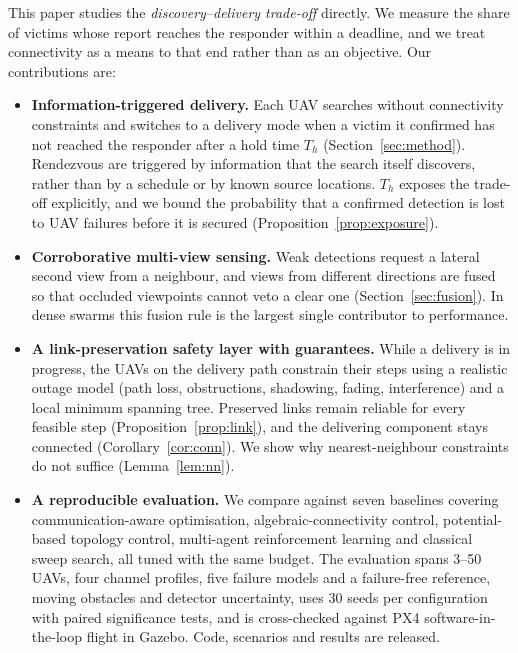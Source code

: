This paper studies the \emph{discovery--delivery trade-off} directly. We measure the share of
victims whose report reaches the responder within a deadline, and we treat connectivity as a means
to that end rather than as an objective. Our contributions are:
\begin{itemize}
\item \textbf{Information-triggered delivery.} Each UAV searches without connectivity constraints and
switches to a delivery mode when a victim it confirmed has not reached the responder after a hold
time $T_h$ (Section~\ref{sec:method}). Rendezvous are triggered by information that the search
itself discovers, rather than by a schedule or by known source locations. $T_h$ exposes the
trade-off explicitly, and we bound the probability that a confirmed detection is lost to UAV
failures before it is secured (Proposition~\ref{prop:exposure}).
\item \textbf{Corroborative multi-view sensing.} Weak detections request a lateral second view from a
neighbour, and views from different directions are fused so that occluded viewpoints cannot veto a
clear one (Section~\ref{sec:fusion}). In dense swarms this fusion rule is the largest single
contributor to performance.
\item \textbf{A link-preservation safety layer with guarantees.} While a delivery is in progress,
the UAVs on the delivery path constrain their steps using a realistic outage model (path loss,
obstructions, shadowing, fading, interference) and a local minimum spanning tree. Preserved links
remain reliable for every feasible step (Proposition~\ref{prop:link}), and the delivering component
stays connected (Corollary~\ref{cor:conn}). We show why nearest-neighbour constraints do not
suffice (Lemma~\ref{lem:nn}).
\item \textbf{A reproducible evaluation.} We compare against seven baselines covering
communication-aware optimisation, algebraic-connectivity control, potential-based topology control,
multi-agent reinforcement learning and classical sweep search, all tuned with the same budget. The
evaluation spans 3--50 UAVs, four channel profiles, five failure models and a failure-free reference, moving obstacles and
detector uncertainty, uses 30 seeds per configuration with paired significance tests, and is
cross-checked against PX4 software-in-the-loop flight in Gazebo. Code, scenarios and results are
released.
\end{itemize}

